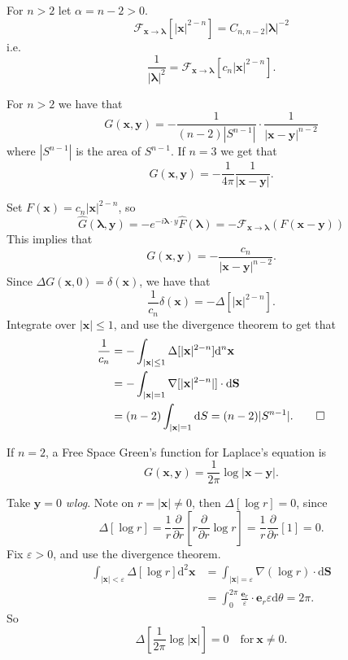 \documentclass{article}
\begin{document}
For $ n>2 $ let $ \alpha=n-2>0 $.
\[
	\mathcal F_{\mathbf x\to\boldsymbol\lambda}[|\mathbf x|^{2-n}]=C_{n,n-2}|\boldsymbol\lambda|^{-2}
\]
i.e. 
\[
	\frac 1{|\boldsymbol \lambda|^2}=\mathcal F_{\mathbf x\to\boldsymbol\lambda}[c_n|\mathbf x|^{2-n}].
\]
\begin{proposition}
  For $ n>2 $ we have that
  \[
	  G(\mathbf x,\mathbf y)=-\frac 1{(n-2)|S^{n-1}|}\cdot\frac 1{|\mathbf x-\mathbf y|^{n-2}}
  \]
  where $ |S^{n-1}| $ is the area of $ S^{n-1} $. If $ n=3 $ we get that
  \[
	  G(\mathbf x,\mathbf y)=-\frac 1{4\pi}\frac 1{|\mathbf x-\mathbf y|}.
  \]
\end{proposition}
\pf Set $ F(\mathbf x)=c_n|\mathbf x|^{2-n} $, so
\[
	\hat G(\boldsymbol\lambda,\mathbf y)=-e^{-i\boldsymbol\lambda\cdot y}\hat F(\boldsymbol\lambda)=-\mathcal F_{\mathbf x\to \boldsymbol\lambda}(F(\mathbf x-\mathbf y))
\]
This implies that
\[
	G(\mathbf x,\mathbf y)=-\frac {c_n}{|\mathbf x-\mathbf y|^{n-2}}.
\]
Since $ \Delta G(\mathbf x,0)=\delta(\mathbf x) $, we have that
\[
	\frac 1{c_n}\delta(\mathbf x)=-\Delta[|\mathbf x|^{2-n}].
\]
Integrate over $ |\mathbf x|\le 1 $, and use the divergence theorem to get that
\begin{align*}
	\frac 1{c_n}&=-\int_{|\mathbf x|\le 1}\Delta[|\mathbf x|^{2-n}]\mathrm d^n\mathbf x\\
		    &=-\int_{|\mathbf x|=1}\nabla[|\mathbf x|^{2-n}|]\cdot \mathrm d\mathbf S\\
		    &= (n-2)\int_{|\mathbf x|=1}\mathrm dS=(n-2)|S^{n-1}|.\qed
\end{align*}
\begin{proposition}
  If $ n=2 $, a Free Space Green's function for Laplace's equation is
  \[
	  G(\mathbf x,\mathbf y)=\frac{1}{2\pi}\log|\mathbf x-\mathbf y|.
  \]
\end{proposition}
\pf Take $ \mathbf y=0 $ \textit{wlog}. Note on $ r=|\mathbf x|\ne 0 $, then $ \Delta[\log r]=0 $, since 
\[
	\Delta[\log r]=\frac 1r\frac{\partial}{\partial r}\left[r\frac{\partial }{\partial r}\log r\right]=\frac 1r\frac{\partial}{\partial r}[1]=0.
\]
Fix $ \varepsilon>0 $, and use the divergence theorem.
\begin{align*}
	\int_{|\mathbf x|< \varepsilon}\Delta[\log r]\mathrm d^2\mathbf x &=\int_{|\mathbf x|=\varepsilon}\nabla(\log r)\cdot \mathrm d\mathbf S \\
									    &=\int_0^{2\pi} \frac{\mathbf e_r}{\varepsilon}\cdot \mathbf e_r\varepsilon\mathrm d\theta=2\pi.
\end{align*}
So
\[
	\Delta\left[\frac 1{2\pi}\log |\mathbf x|\right]=0\quad \text{for}\ \mathbf x\ne 0.
\]
\end{document}
